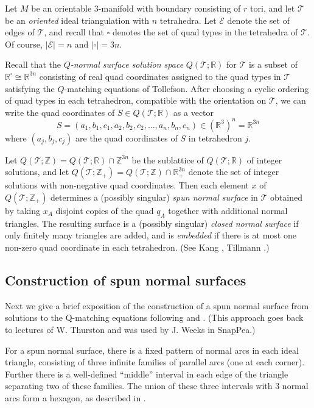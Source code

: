 \documentclass[12pt,reqno]{amsart}  %
\theoremstyle{definition}
\theoremstyle{remark}
\def\R{\mathbb{R}}
\def\calE{\mathcal E}
\newcommand{\T}{\mathcal{T}}
\def\Z{\mathbb Z}
\begin{document}
Let $M$ be an orientable 3-manifold with boundary consisting of $r$ tori, 
and let $\T$ be an {\em oriented} ideal triangulation with $n$ tetrahedra.
Let $\calE$ denote the set of edges of $\T$, and recall that $\square$ 
denotes the set of quad types in the tetrahedra of $\T$. 
Of course, $|\calE|=n$ and $|\square|=3n$.

Recall that the {\em $Q$-normal surface solution space} $Q(\T;\R)$ for 
$\T$ is a subset of $\R^\square \cong \R^{3n}$ consisting of real quad 
coordinates assigned to the quad types in $\T$
satisfying the $Q$-matching equations of Tollefson. 
After choosing a cyclic ordering of quad types in each tetrahedron, 
compatible with the orientation on $\T$, 
we can write the quad coordinates of $S \in Q(\T;\R)$ as a vector
$$
S=(a_1, b_1, c_1, a_2, b_2, c_2, \ldots , a_n, b_n, c_n) \in(\R^3)^n= \R^{3n}
$$
where $(a_j,b_j,c_j)$ are the quad coordinates of $S$ in tetrahedron $j$.

Let $Q(\T;\Z) = Q(\T;\R) \cap \Z^{3n}$ be the sublattice of $Q(\T;\R)$ of 
integer solutions, and  let $Q(\T;\Z_+) = Q(\T;\Z) \cap \R_+^{3n} $ denote 
the set of integer solutions with non-negative quad coordinates. Then 
each element $x$ of $Q(\T;\Z_+)$ determines a (possibly singular) 
{\em spun normal surface} in $\T$ obtained by taking $x_A$ disjoint copies 
of the quad $q_A$ together with additional normal triangles. 
The resulting surface  is a (possibly singular) {\em closed normal surface} 
if only finitely many triangles are added, and is {\em embedded} if there 
is at most one non-zero quad coordinate in each tetrahedron.
(See Kang \cite{Kang},  Tillmann \cite{Ti}.)

\subsection{Construction of spun normal surfaces} 
\label{spun_normal_construction}

Next we give a brief exposition of the construction of a spun normal surface
from solutions to the Q-matching equations following \cite{DuGa} and 
\cite{Ti}. (This approach goes back to lectures of W. Thurston and was used 
by J. Weeks in SnapPea.)

For a spun normal surface, there is a fixed pattern of normal arcs in each 
ideal triangle, consisting  of three infinite families of parallel arcs 
(one at each corner). Further there is a well-defined ``middle'' interval 
in each edge of the triangle separating two of these families. The union 
of these three intervals with 3 normal arcs form a hexagon, as described 
in \cite{DuGa}.
\end{document}
